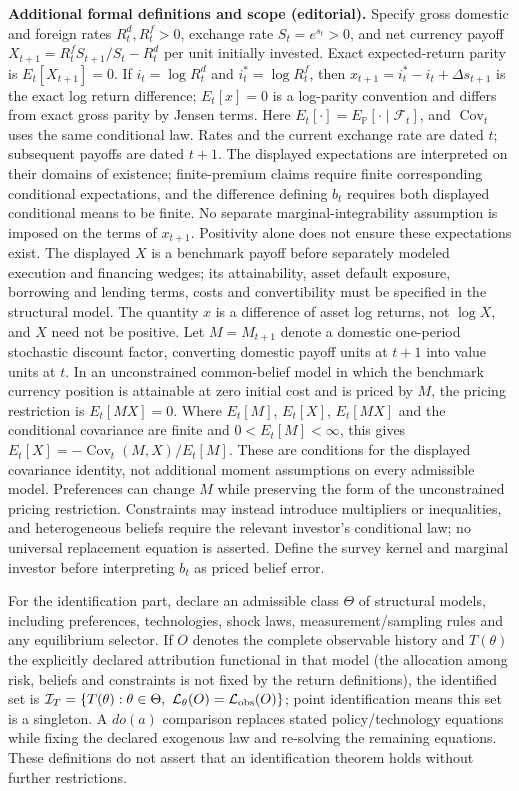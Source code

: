 \documentclass[11pt,a4paper]{article}
\begin{document}
\textbf{Additional formal definitions and scope (editorial).} Specify gross domestic and foreign rates \(R_t^d,R_t^f>0\), exchange rate \(S_t=e^{s_t}>0\), and net currency payoff \(X_{t+1}=R_t^f S_{t+1}/S_t-R_t^d\) per unit initially invested. Exact expected-return parity is \(E_t[X_{t+1}]=0\). If \(i_t=\log R_t^d\) and \(i_t^*=\log R_t^f\), then \(x_{t+1}=i_t^*-i_t+\Delta s_{t+1}\) is the exact log return difference; \(E_t[x]=0\) is a log-parity convention and differs from exact gross parity by Jensen terms. Here \(E_t[\cdot]=E_{\mathbb P}[\cdot\mid\mathcal F_t]\), and \(\operatorname{Cov}_t\) uses the same conditional law. Rates and the current exchange rate are dated \(t\); subsequent payoffs are dated \(t+1\). The displayed expectations are interpreted on their domains of existence; finite-premium claims require finite corresponding conditional expectations, and the difference defining \(b_t\) requires both displayed conditional means to be finite. No separate marginal-integrability assumption is imposed on the terms of \(x_{t+1}\). Positivity alone does not ensure these expectations exist. The displayed \(X\) is a benchmark payoff before separately modeled execution and financing wedges; its attainability, asset default exposure, borrowing and lending terms, costs and convertibility must be specified in the structural model. The quantity \(x\) is a difference of asset log returns, not \(\log X\), and \(X\) need not be positive. Let \(M=M_{t+1}\) denote a domestic one-period stochastic discount factor, converting domestic payoff units at \(t+1\) into value units at \(t\). In an unconstrained common-belief model in which the benchmark currency position is attainable at zero initial cost and is priced by \(M\), the pricing restriction is \(E_t[M X]=0\). Where \(E_t[M]\), \(E_t[X]\), \(E_t[MX]\) and the conditional covariance are finite and \(0<E_t[M]<\infty\), this gives \(E_t[X]=-\operatorname{Cov}_t(M,X)/E_t[M]\). These are conditions for the displayed covariance identity, not additional moment assumptions on every admissible model. Preferences can change \(M\) while preserving the form of the unconstrained pricing restriction. Constraints may instead introduce multipliers or inequalities, and heterogeneous beliefs require the relevant investor's conditional law; no universal replacement equation is asserted. Define the survey kernel and marginal investor before interpreting \(b_t\) as priced belief error.

For the identification part, declare an admissible class \(\Theta\) of structural models, including preferences, technologies, shock laws, measurement/sampling rules and any equilibrium selector. If \(O\) denotes the complete observable history and \(T(\theta)\) the explicitly declared attribution functional in that model (the allocation among risk, beliefs and constraints is not fixed by the return definitions), the identified set is \(\mathcal I_T=\{T(\theta):\theta\in\Theta,\ \mathcal L_\theta(O)=\mathcal L_{\rm obs}(O)\}\); point identification means this set is a singleton. A \(do(a)\) comparison replaces stated policy/technology equations while fixing the declared exogenous law and re-solving the remaining equations. These definitions do not assert that an identification theorem holds without further restrictions.
\end{document}
